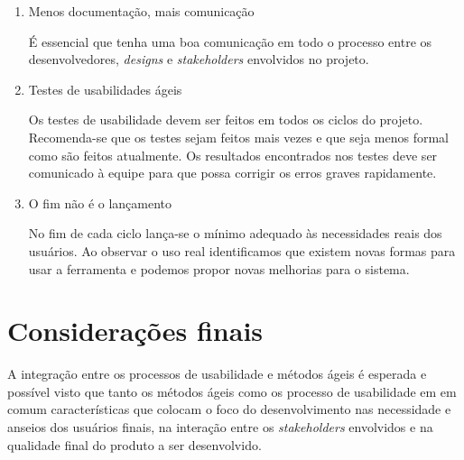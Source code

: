 \begin{enumerate}
\item Menos documentação, mais comunicação

	É essencial que tenha uma boa comunicação em todo o processo entre os desenvolvedores, \emph{designs} e \textit{stakeholders} envolvidos no projeto.



\item Testes de usabilidades ágeis

	Os testes de usabilidade devem ser feitos em todos os ciclos do projeto. Recomenda-se que os testes sejam feitos mais vezes e que seja menos formal como são feitos atualmente. Os resultados encontrados nos testes deve ser comunicado à equipe para que possa corrigir os erros  graves rapidamente.


\item O fim não é o lançamento

	No fim de cada ciclo lança-se o mínimo adequado às necessidades reais dos usuários. Ao observar o uso real identificamos que existem novas formas para usar a ferramenta e podemos propor novas melhorias para o sistema. 
	
\end{enumerate}


\section{Considerações finais}

	A integração entre os processos de usabilidade e métodos ágeis é esperada e possível visto que tanto os métodos ágeis como os processo de usabilidade em em comum características que colocam o foco do desenvolvimento nas necessidade e anseios dos usuários finais, na interação entre os \textit{stakeholders} envolvidos e na qualidade final do produto a ser desenvolvido.






